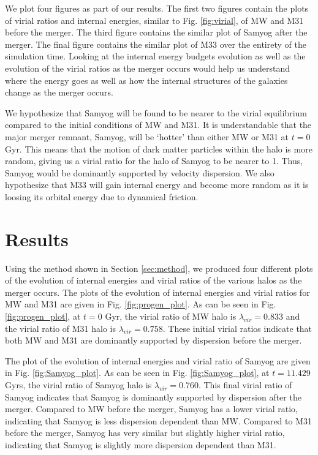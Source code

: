 \documentclass[twocolumn]{aastex631}
\begin{document}
We plot four figures as part of our results. The first two figures contain the plots of virial ratios and internal energies, similar to Fig. \ref{fig:virial}, of MW and M31 before the merger. The third figure contains the similar plot of Samyog after the merger. The final figure contains the similar plot of M33 over the entirety of the simulation time. Looking at the internal energy budgets evolution as well as the evolution of the virial ratios as the merger occurs would help us understand where the energy goes as well as how the internal structures of the galaxies change as the merger occurs.

We hypothesize that Samyog will be found to be nearer to the virial equilibrium compared to the initial conditions of MW and M31. It is understandable that the major merger remnant, Samyog, will be `hotter' than either MW or M31 at $t=0$ Gyr. This means that the motion of dark matter particles within the halo is more random, giving us a virial ratio for the halo of Samyog to be nearer to 1. Thus, Samyog would be dominantly supported by velocity dispersion. We also hypothesize that M33 will gain internal energy and become more random as it is loosing its orbital energy due to dynamical friction. 

\section{Results}
\label{sec:res}

Using the method shown in Section \ref{sec:method}, we produced four different plots of the evolution of internal energies and virial ratios of the various halos as the merger occurs. The plots of the evolution of internal energies and virial ratios for MW and M31 are given in Fig. \ref{fig:progen_plot}. As can be seen in Fig. \ref{fig:progen_plot}, at $t=0$ Gyr, the virial ratio of MW halo is $\lambda_{vir} = 0.833$ and the virial ratio of M31 halo is $\lambda_{vir} = 0.758$. These initial virial ratios indicate that both MW and M31 are dominantly supported by dispersion before the merger.

The plot of the evolution of internal energies and virial ratio of Samyog are given in Fig. \ref{fig:Samyog_plot}. As can be seen in Fig. \ref{fig:Samyog_plot}, at $t=11.429$ Gyrs, the virial ratio of Samyog halo is $\lambda_{vir} = 0.760$. This final virial ratio of Samyog indicates that Samyog is dominantly supported by dispersion after the merger. Compared to MW before the merger, Samyog has a lower virial ratio, indicating that Samyog is less dispersion dependent than MW. Compared to M31 before the merger, Samyog has very similar but slightly higher virial ratio, indicating that Samyog is slightly more dispersion dependent than M31.
\end{document}
